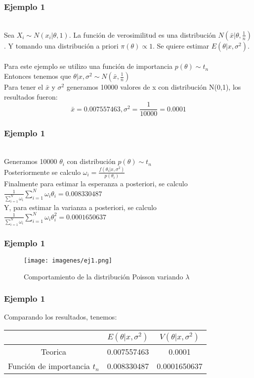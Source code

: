 \documentclass[12pt]{beamer}
\begin{document}
\begin{frame}
\frametitle{Ejemplo 1}
~\\Sea $X_{i}\sim N(x_{i}|\theta,1)$. La función de verosimilitud es una distribución $N(\bar{x}|\theta,\frac{1}{n})$. Y tomando una distribución a priori $\pi(\theta)\propto 1$. Se quiere estimar $E(\theta|x,\sigma^2)$.\\
~\\Para este ejemplo se utilizo una función de importancia $p(\theta)\sim t_{n}$
~\\Entonces tenemos que $\theta|x,\sigma^2\sim N(\bar{x},\frac{1}{n})$
~\\Para tener el $\bar{x}$ y $\sigma^2$ generamos 10000 valores de x con distribución N(0,1), los resultados fueron:
$$\bar{x}=0.007557463, \sigma^2=\frac{1}{10000}=0.0001$$
\end{frame}

\begin{frame}
\frametitle{Ejemplo 1}
~\\Generamos 10000 $\theta_{i}$ con distribución $p(\theta)\sim t_{n}$
~\\Posteriormente se calculo $\omega_{i}=\frac{f(\theta_{i}|x,\sigma^2)}{p(\theta_{i})}$
~\\Finalmente para estimar la esperanza a posteriori, se calculo $\frac{1}{\sum\limits_{i=1}^{N}\omega_{i}}\sum\limits_{i=1}^{N}\omega_{i}\theta_{i}=0.008330487$
~\\Y, para estimar la varianza a posteriori, se calculo $\frac{1}{\sum\limits_{i=1}^{N}\omega_{i}}\sum\limits_{i=1}^{N}\omega_{i}\theta_{i}^2=0.0001650637$
\end{frame}

\begin{frame}
\frametitle{Ejemplo 1}
\begin{figure}[!h]
    \begin{center}
        \texttt{[image: imagenes/ej1.png]}
        \caption{Comportamiento de la distribución Poisson variando $\lambda$}
        \label{fig:Densidad}
    \end{center}
\end{figure}
\end{frame}

\begin{frame}
\frametitle{Ejemplo 1}
Comparando los resultados, tenemos:
\begin{tabular}{|c|c|c|}
\hline 
 & $E(\theta|x,\sigma^2)$ & $V(\theta|x,\sigma^2)$ \\ 
\hline 
Teorica & 0.007557463 & 0.0001 \\ 
Función de importancia $t_{n}$ &  0.008330487 & 0.0001650637 \\ 
\hline 
\end{tabular} 
\end{frame}
\end{document}
